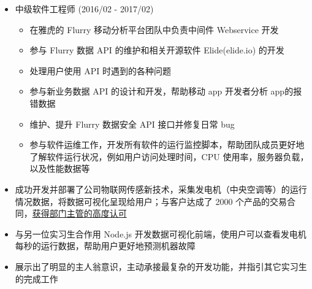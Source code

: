 \documentclass[10pt,a4paper,ragged2e,withhyper]{altacv}
\begin{document}
\begin{itemize}
    \item 中级软件工程师 (2016/02 - 2017/02)
    \begin{itemize}
        \item 在雅虎的 Flurry 移动分析平台团队中负责中间件 Webservice 开发
        \item 参与 Flurry 数据 API 的维护和相关开源软件 Elide(elide.io) 的开发
        \item 处理用户使用 API 时遇到的各种问题
        \item 参与新业务数据 API 的设计和开发，帮助移动 app 开发者分析 app的报错数据
        \item 维护、提升 Flurry 数据安全 API 接口并修复日常 bug
        \item 参与软件运维工作，开发所有软件的运行监控脚本，帮助团队成员更好地了解软件运行状况，例如用户访问处理时间，CPU 使用率，服务器负载，以及性能数据等
    \end{itemize}
    \end{itemize}

    \divider

    \begin{itemize}
    \item 成功开发并部署了公司物联网传感新技术，采集发电机（中央空调等）的运行情况数据，将数据可视化呈现给用户；与客户达成了 2000 个产品的交易合同，\href{https://github.com/QubitPi/resume/blob/master/recommendation.png?raw=true}{获得部门主管的高度认可}
    \item 与另一位实习生合作用 Node.js 开发数据可视化前端，使用户可以查看发电机每秒的运行数据，帮助用户更好地预测机器故障
    \item 展示出了明显的主人翁意识，主动承接最复杂的开发功能，并指引其它实习生的完成工作
    \end{itemize}
\end{document}
